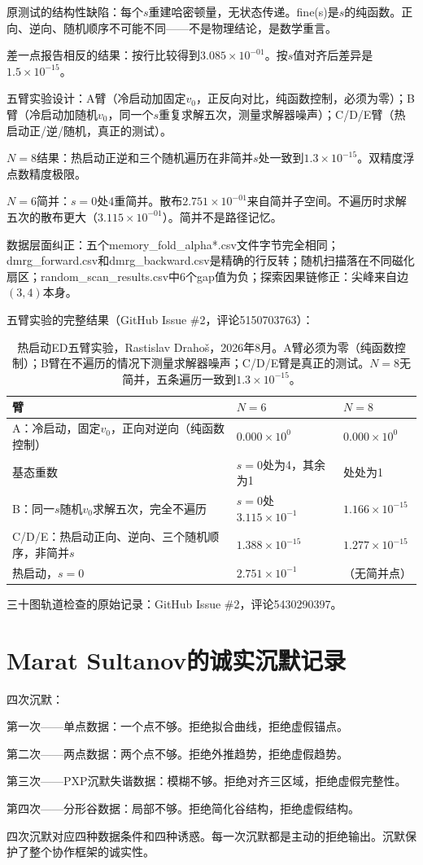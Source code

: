 \documentclass[11pt,a4paper]{book}
\theoremstyle{definition}
\begin{document}
原测试的结构性缺陷：每个$s$重建哈密顿量，无状态传递。fine(s)是$s$的纯函数。正向、逆向、随机顺序不可能不同——不是物理结论，是数学重言。

差一点报告相反的结果：按行比较得到$3.085\times10^{-01}$。按$s$值对齐后差异是$1.5\times10^{-15}$。

五臂实验设计：A臂（冷启动加固定$v_0$，正反向对比，纯函数控制，必须为零）；B臂（冷启动加随机$v_0$，同一个$s$重复求解五次，测量求解器噪声）；C/D/E臂（热启动正/逆/随机，真正的测试）。

$N=8$结果：热启动正逆和三个随机遍历在非简并$s$处一致到$1.3\times10^{-15}$。双精度浮点数精度极限。

$N=6$简并：$s=0$处4重简并。散布$2.751\times10^{-01}$来自简并子空间。不遍历时求解五次的散布更大（$3.115\times10^{-01}$）。简并不是路径记忆。

数据层面纠正：五个memory\_fold\_alpha*.csv文件字节完全相同；dmrg\_forward.csv和dmrg\_backward.csv是精确的行反转；随机扫描落在不同磁化扇区；random\_scan\_results.csv中6个gap值为负；探索因果链修正：尖峰来自边$(3,4)$本身。


五臂实验的完整结果（GitHub Issue \#2，评论5150703763）：

\begin{table}[h]
\centering
\begin{tabular}{lll}
\toprule
臂 & $N=6$ & $N=8$ \\
\midrule
A：冷启动，固定$v_0$，正向对逆向（纯函数控制） & $0.000\times10^{0}$ & $0.000\times10^{0}$ \\
基态重数 & $s=0$处为4，其余为1 & 处处为1 \\
B：同一$s$随机$v_0$求解五次，完全不遍历 & $s=0$处$3.115\times10^{-1}$ & $1.166\times10^{-15}$ \\
C/D/E：热启动正向、逆向、三个随机顺序，非简并$s$ & $1.388\times10^{-15}$ & $1.277\times10^{-15}$ \\
热启动，$s=0$ & $2.751\times10^{-1}$ & （无简并点） \\
\bottomrule
\end{tabular}
\caption{热启动ED五臂实验，Rastislav Drahoš，2026年8月。A臂必须为零（纯函数控制）；B臂在不遍历的情况下测量求解器噪声；C/D/E臂是真正的测试。$N=8$无简并，五条遍历一致到$1.3\times10^{-15}$。}
\end{table}

三十图轨道检查的原始记录：GitHub Issue \#2，评论5430290397。

\chapter{Marat Sultanov的诚实沉默记录}

四次沉默：

第一次——单点数据：一个点不够。拒绝拟合曲线，拒绝虚假锚点。

第二次——两点数据：两个点不够。拒绝外推趋势，拒绝虚假趋势。

第三次——PXP沉默失谐数据：模糊不够。拒绝对齐三区域，拒绝虚假完整性。

第四次——分形谷数据：局部不够。拒绝简化谷结构，拒绝虚假结构。

四次沉默对应四种数据条件和四种诱惑。每一次沉默都是主动的拒绝输出。沉默保护了整个协作框架的诚实性。
\end{document}
